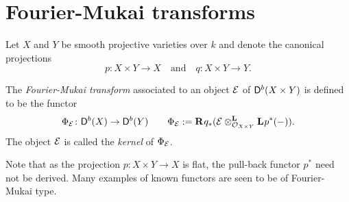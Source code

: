\section{Fourier-Mukai transforms}
\label{Chapter: Fourier-Mukai transforms}

Let $X$ and $Y$ be smooth projective varieties over $k$ and denote the canonical projections 
\[
    p \colon X \times Y \to X \quad \text{and} \quad q \colon X \times Y \to Y.
\]

\begin{definition}
    The \emph{Fourier-Mukai transform} associated to an object $\E$ of $\derb{X \times Y}$ is defined to be the functor
    \[
        \fm{\E} \colon \derb{X} \to \derb{Y} \qquad \fm{\E} := \rderived{}{q_*}(\derivedtensor{\E}{\lderived{}{p^*}(-)}{\struct{X \times Y}}).
    \]
    The object $\E$ is called the \emph{kernel} of $\fm{\E}$.
\end{definition}

Note that as the projection $p \colon X \times Y \to X$ is flat, the pull-back functor $p^*$ need not be derived. Many examples of known functors are seen to be of Fourier-Mukai type.

